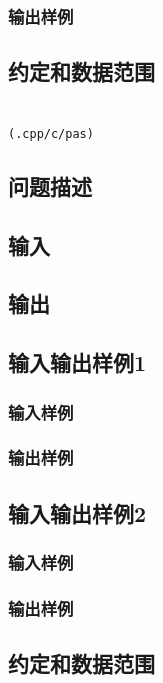 \documentclass[UTF8]{ctexart}
\begin{document}
\subsubsection{输出样例}


\subsection{约定和数据范围}

\newpage
\section{}
\begin{center}
\tt\large{(.cpp/c/pas)}
\end{center}
\subsection{问题描述}

\subsection{输入}
\subsection{输出}

\subsection{输入输出样例1}
\subsubsection{输入样例}
\subsubsection{输出样例}

\subsection{输入输出样例2}
\subsubsection{输入样例}
\subsubsection{输出样例}


\subsection{约定和数据范围}
\end{document}
